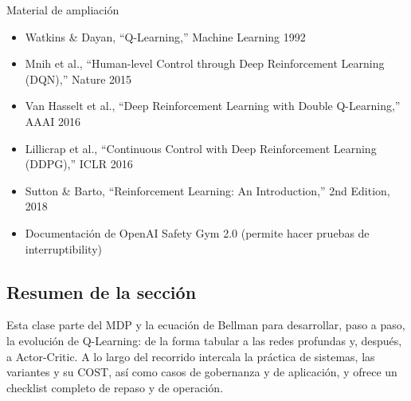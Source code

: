 \begin{knowledgebox}{Material de ampliación}
\begin{itemize}
    \item Watkins \& Dayan, ``Q-Learning,'' Machine Learning 1992
    \item Mnih et al., ``Human-level Control through Deep Reinforcement Learning (DQN),'' Nature 2015
    \item Van Hasselt et al., ``Deep Reinforcement Learning with Double Q-Learning,'' AAAI 2016
    \item Lillicrap et al., ``Continuous Control with Deep Reinforcement Learning (DDPG),'' ICLR 2016
    \item Sutton \& Barto, ``Reinforcement Learning: An Introduction,'' 2nd Edition, 2018
    \item Documentación de OpenAI Safety Gym 2.0 (permite hacer pruebas de interruptibility)
\end{itemize}
\end{knowledgebox}

\subsection{Resumen de la sección}

Esta clase parte del MDP y la ecuación de Bellman para desarrollar, paso a paso, la evolución de Q-Learning: de la forma tabular a las redes profundas y, después, a Actor-Critic. A lo largo del recorrido intercala la práctica de sistemas, las variantes y su COST, así como casos de gobernanza y de aplicación, y ofrece un checklist completo de repaso y de operación.


